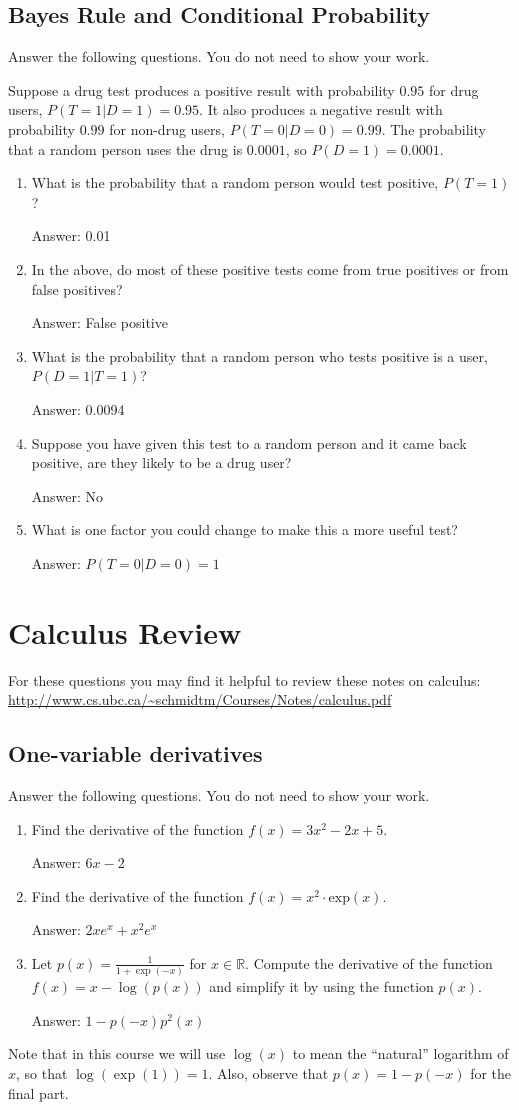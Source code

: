 \documentclass{article}
\def\ans#1{\par\gre{Answer: #1}}
\def\blu#1{{\color{blu}#1}}
\def\gre#1{{\color{gre}#1}}
\def\R{\mathbb{R}}
\begin{document}
\clearpage

\subsection{Bayes Rule and Conditional Probability}

\blu{Answer the following questions.} You do not need to show your work.

Suppose a drug test produces a positive result with probability $0.95$ for drug users, $P(T=1|D=1)=0.95$. It also produces a negative result with probability $0.99$ for non-drug users, $P(T=0|D=0)=0.99$. The probability that a random person uses the drug is $0.0001$, so $P(D=1)=0.0001$.

\begin{enumerate}
\item What is the probability that a random person would test positive, $P(T=1)$?
\ans{0.01}
\item In the above, do most of these positive tests come from true positives or from false positives?
\ans{False positive}
\item What is the probability that a random person who tests positive is a user, $P(D=1|T=1)$?
\ans{0.0094}
\item Suppose you have given this test to a random person and it came back positive, are they likely to be a drug user?
\ans{No}
\item What is one factor you could change to make this a more useful test?
\ans{$P(T=0|D=0)=1$}
\end{enumerate}

\clearpage

\section{Calculus Review}

For these questions you may find it helpful to review these notes on calculus:\\
\url{http://www.cs.ubc.ca/~schmidtm/Courses/Notes/calculus.pdf}\\

\subsection{One-variable derivatives}

\blu{Answer the following questions.} You do not need to show your work.

\begin{enumerate}
\item Find the derivative of the function $f(x) = 3x^2 -2x + 5$.
\ans{$6x-2$}
\item Find the derivative of the function $f(x) = x^2 \cdot \textrm{exp}(x)$.
\ans{$2xe^x+x^2e^x$}
\item Let $p(x) = \frac{1}{1+\exp(-x)}$ for $x \in \R$. Compute the derivative of the function $f(x) = x-\log(p(x))$ and simplify it by using the function $p(x)$.
\ans{$1-p(-x)p^2(x)$}
\end{enumerate}
Note that in this course we will use $\log(x)$ to mean the ``natural'' logarithm of $x$, so that $\log(\exp(1)) = 1$. Also, observe that $p(x) = 1-p(-x)$ for the final part.
\end{document}
